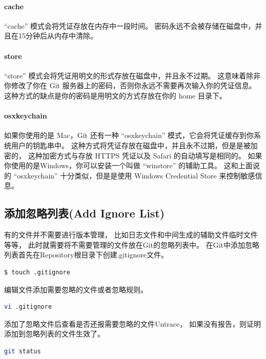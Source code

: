 \documentclass{book}
\begin{document}
\paragraph{cache}“cache” 模式会将凭证存放在内存中一段时间。 密码永远不会被存储在磁盘中，并且在15分钟后从内存中清除。

\paragraph{store}“store” 模式会将凭证用明文的形式存放在磁盘中，并且永不过期。 这意味着除非你修改了你在 Git 服务器上的密码，否则你永远不需要再次输入你的凭证信息。 这种方式的缺点是你的密码是用明文的方式存放在你的 home 目录下。

\paragraph{osxkeychain}
如果你使用的是 Mac，Git 还有一种 “osxkeychain” 模式，它会将凭证缓存到你系统用户的钥匙串中。 这种方式将凭证存放在磁盘中，并且永不过期，但是是被加密的，
这种加密方式与存放 HTTPS 凭证以及 Safari 的自动填写是相同的。
如果你使用的是Windows，你可以安装一个叫做 “winstore” 的辅助工具。 
这和上面说的 “osxkeychain” 十分类似，但是是使用 Windows Credential Store 来控制敏感信息。

\subsection{添加忽略列表(Add Ignore List)}

有的文件并不需要进行版本管理，
比如日志文件和中间生成的辅助文件临时文件等等，
此时就需要将不需要管理的文件放在Git的忽略列表中。
在Git中添加忽略列表首先在Repository根目录下创建.gitignore文件。

\begin{lstlisting}[language=Bash]
$ touch .gitignore
\end{lstlisting}

编辑文件添加需要忽略的文件或者忽略规则。

\begin{lstlisting}[language=Bash]
vi .gitignore
\end{lstlisting}

添加了忽略文件后查看是否还报需要忽略的文件Untrace，
如果没有报告，则证明添加到忽略列表的文件生效了。

\begin{lstlisting}[language=Bash]
git status
\end{lstlisting}
\end{document}
